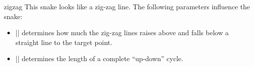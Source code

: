 \begin{snake}{zigzag}
  This snake looks like a zig-zag line. The following parameters
  influence the snake:
  \begin{itemize}
  \item |\pgfsnakesegmentamplitude|
    determines how much the zig-zag lines raises above and falls below
    a straight line to the target point.
  \item |\pgfsnakesegmentlength|
    determines the length of a complete ``up-down'' cycle.
  \end{itemize}
\begin{codeexample}[]
\end{codeexample}
\end{snake}



